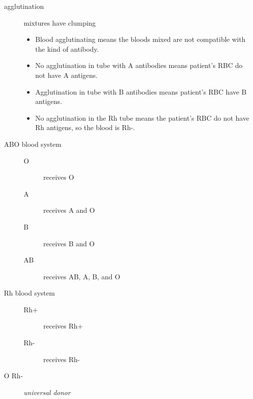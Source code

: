 \documentclass[11pt]{article}
\begin{document}
\begin{description}
\item[{agglutination}] mixtures have clumping

\begin{itemize}
\item Blood agglutinating means the bloods mixed are not compatible with the
kind of antibody.

\item No agglutination in tube with A antibodies means patient's RBC do not
have A antigens.

\item Agglutination in tube with B antibodies means patient's RBC have B
antigens.

\item No agglutination in the Rh tube means the patient's RBC do not have Rh
antigens, so the blood is Rh-.
\end{itemize}

\item[{ABO blood system}] \begin{description}
\item[{O}] receives O

\item[{A}] receives A and O

\item[{B}] receives B and O

\item[{AB}] receives AB, A, B, and O
\end{description}

\item[{Rh blood system}] \begin{description}
\item[{Rh+}] receives Rh+

\item[{Rh-}] receives Rh-
\end{description}

\item[{O Rh-}] \emph{universal donor}
\end{description}
\end{document}
